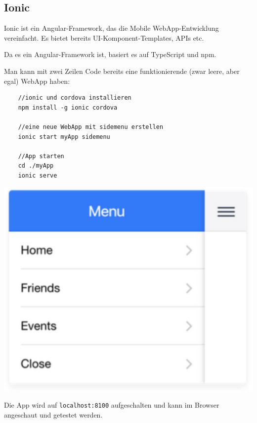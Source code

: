 \documentclass[a4paper, 11pt]{article}
\newcommand{\code}[1]{\texttt{#1}}
\begin{document}
\subsection{Ionic}
Ionic ist ein Angular-Framework, das die Mobile WebApp-Entwicklung vereinfacht. Es bietet bereits UI-Komponent-Templates, APIs etc. 

Da es ein Angular-Framework ist, basiert es auf TypeScript und npm.
\vspace{10px}

\noindent Man kann mit zwei Zeilen Code bereits eine funktionierende (zwar leere, aber egal) WebApp haben: \\
\begin{minipage}{0.6\textwidth}
	\begin{lstlisting}
	//ionic und cordova installieren
	npm install -g ionic cordova
	
	//eine neue WebApp mit sidemenu erstellen
	ionic start myApp sidemenu
	
	//App starten
	cd ./myApp
	ionic serve
	\end{lstlisting}
\end{minipage} \hfil
\begin{minipage}{0.35\textwidth}
	\includegraphics[keepaspectratio=true, height=10\baselineskip]{ionic_sidemenu.PNG}
\end{minipage}

Die App wird auf \code{localhost:8100} aufgeschalten und kann im Browser angeschaut und getestet werden.
\end{document}
